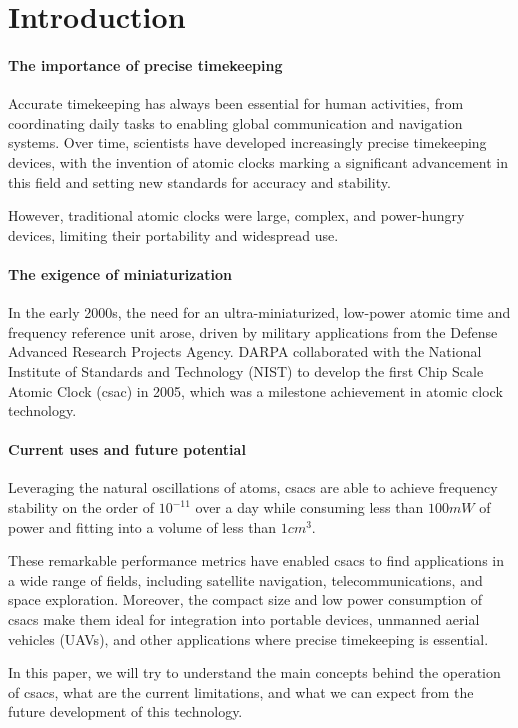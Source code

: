 \section{Introduction}
\label{sec:introduction}

\paragraph{The importance of precise timekeeping}

Accurate timekeeping has always been essential for human activities, from coordinating daily tasks to enabling global communication and navigation systems.
Over time, scientists have developed increasingly precise timekeeping devices, with the invention of atomic clocks marking a significant advancement in this field and setting new standards for accuracy and stability.

However, traditional atomic clocks were large, complex, and power-hungry devices, limiting their portability and widespread use.

\paragraph{The exigence of miniaturization}

In the early 2000s, the need for an ultra-miniaturized, low-power atomic time and frequency reference unit arose, driven by military applications from the Defense Advanced Research Projects Agency.
DARPA collaborated with the National Institute of Standards and Technology (NIST) to develop the first Chip Scale Atomic Clock (\acrshort{csac}) in 2005, which was a milestone achievement in atomic clock technology.

\paragraph{Current uses and future potential}

Leveraging the natural oscillations of atoms, \acrshort{csacs} are able to achieve frequency stability on the order of $10^{-11}$ over a day while consuming less than $100 mW$ of power and fitting into a volume of less than $1 cm^3$.

These remarkable performance metrics have enabled \acrshort{csacs} to find applications in a wide range of fields, including satellite navigation, telecommunications, and space exploration.
Moreover, the compact size and low power consumption of \acrshort{csacs} make them ideal for integration into portable devices, unmanned aerial vehicles (UAVs), and other applications where precise timekeeping is essential.

In this paper, we will try to understand the main concepts behind the operation of \acrshort{csacs}, what are the current limitations, and what we can expect from the future development of this technology.